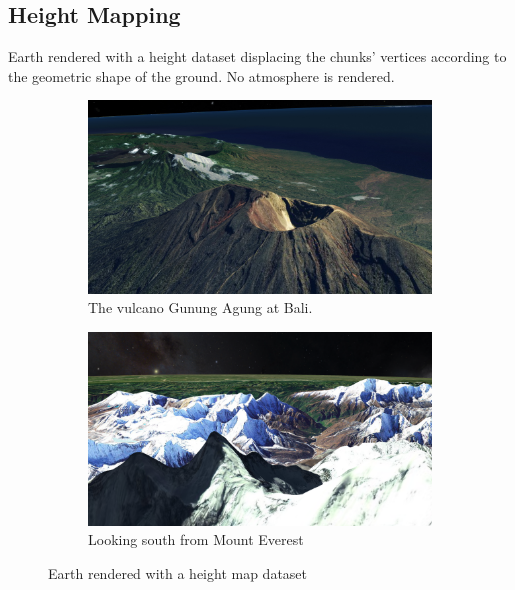 \subsection{Height Mapping}
\FloatBarrier
Earth rendered with a height dataset displacing the chunks' vertices according to the geometric shape of the ground. No atmosphere is rendered.
\begin{figure}[h]
    \centering
    \begin{subfigure}[bt]{0.9\textwidth}
        \includegraphics[width=\textwidth]{figures/results/screenshots/height_bali.png}
        \caption{The vulcano Gunung Agung at Bali.}
    \end{subfigure}
    \begin{subfigure}[bt]{0.9\textwidth}
        \includegraphics[width=\textwidth]{figures/results/screenshots/height_mt_everest.png}
        \caption{Looking south from Mount Everest}
    \end{subfigure}
    \caption{Earth rendered with a height map dataset}
\end{figure}

\clearpage
